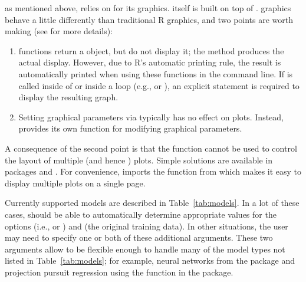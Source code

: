  as mentioned above,  relies on  for its graphics.  itself is built on top of  \citep{grid-pkg}.  graphics behave a little differently than traditional R graphics, and two points are worth making (see  for more details):
\begin{enumerate}
  \item {} functions return a  object, but do not display it; the  method produces the actual display. However, due to R's automatic printing rule, the result is automatically printed when using these functions in the command line. If  is called inside of  or inside a loop (e.g.,  or ), an explicit  statement is required to display the resulting graph.
  \item Setting graphical parameters via  typically has no effect on  plots. Instead,  provides its own  function for modifying graphical parameters.
\end{enumerate}
A consequence of the second point is that the  function cannot be used to control the layout of multiple  (and hence ) plots. Simple solutions are available in packages  \citep{latticeExtra-pkg} and  \citep{gridExtra-pkg}. For convenience,  imports the  function from  which makes it easy to display multiple  plots on a single page.

Currently supported models are described in Table~\ref{tab:models}. In a lot of these cases,  should be able to automatically determine appropriate values for the options  (i.e.,  or ) and  (the original training data). In other situations, the user may need to specify one or both of these additional arguments. These two arguments allow  to be flexible enough to handle many of the model types not listed in Table~\ref{tab:models}; for example, neural networks from the  package \citep{venables-modern-2002} and projection pursuit regression \citep{friedman-ppr-1981} using the  function in the  package.

